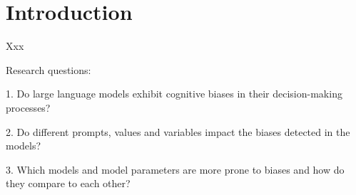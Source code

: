 \section{Introduction}
Xxx

\par Research questions:
\par 1. Do large language models exhibit cognitive biases in their decision-making processes?
\par 2. Do different prompts, values and variables impact the biases detected in the models?
\par 3. Which models and model parameters are more prone to biases and how do they compare to each other?